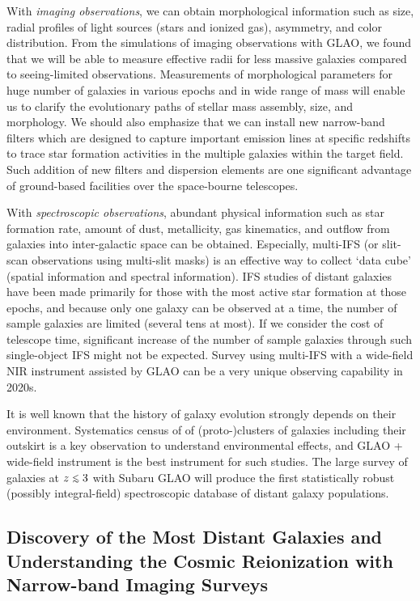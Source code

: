 With {\it imaging observations}, we can obtain morphological information
such as size, radial profiles of light sources (stars and ionized gas),
asymmetry, and color distribution. From the simulations of imaging
observations with GLAO, 
we found that we will be able to measure effective radii for less
massive galaxies compared to seeing-limited observations. Measurements
of morphological parameters for huge number of galaxies in various
epochs and in wide  range of mass will enable us to clarify the
evolutionary paths of stellar mass assembly, size, and morphology. We
should also emphasize that we can install new narrow-band filters which
are designed to capture important emission lines at specific redshifts
to trace star formation activities in the multiple galaxies within the
target field. Such addition of new filters and dispersion elements are
one significant advantage of ground-based facilities over the
space-bourne telescopes.

With {\it spectroscopic observations}, abundant physical information
such as star formation rate, amount of dust, metallicity, gas
kinematics, and outflow from galaxies into inter-galactic space can be
obtained.
Especially, multi-IFS (or slit-scan observations using multi-slit masks)
is an effective way to collect `data cube' (spatial information and
spectral information). IFS studies of distant galaxies have been made 
primarily for those with the most active star formation at those
epochs, and because only one galaxy can be observed at a time, the
number of sample galaxies are limited (several tens at most). If we
consider the cost of telescope time, significant increase of the number
of sample galaxies through such single-object IFS might not be
expected. Survey using multi-IFS with a wide-field NIR instrument
assisted by GLAO can be a very unique observing capability in 2020s. 

It is well known that the history of galaxy evolution strongly depends
on their environment. Systematics census of of (proto-)clusters of
galaxies including their outskirt is a key observation to understand
environmental effects, and GLAO + wide-field instrument is the best
instrument for such studies. 
The large survey of galaxies at $z\lsim 3$ with Subaru GLAO will produce
the first statistically robust (possibly integral-field) spectroscopic
database of distant galaxy populations.


\subsection{Discovery of the Most Distant Galaxies and Understanding the
  Cosmic Reionization with Narrow-band Imaging Surveys}

